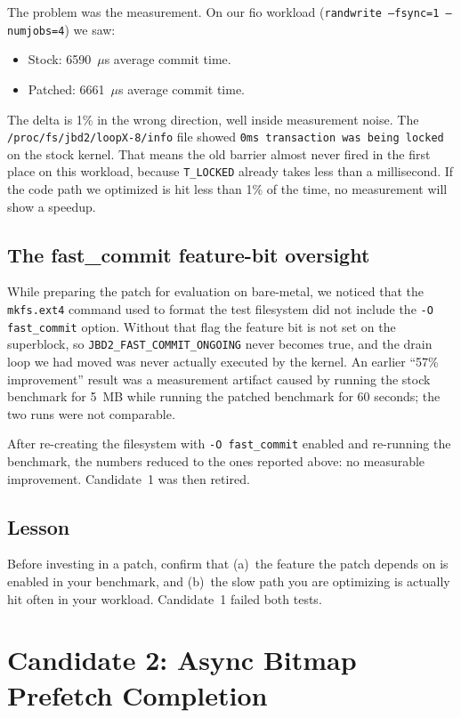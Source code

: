 \documentclass[11pt,a4paper]{article}
\begin{document}
The problem was the measurement. On our fio workload
(\texttt{randwrite --fsync=1 --numjobs=4}) we saw:
\begin{itemize}[leftmargin=*]
  \item Stock: 6590~$\mu$s average commit time.
  \item Patched: 6661~$\mu$s average commit time.
\end{itemize}

The delta is 1\% in the wrong direction, well inside measurement
noise. The \texttt{/proc/fs/jbd2/loopX-8/info} file showed
\texttt{0ms transaction was being locked} on the stock kernel.
That means the old barrier almost never fired in the first place on
this workload, because \texttt{T\_LOCKED} already takes less than a
millisecond. If the code path we optimized is hit less than 1\% of
the time, no measurement will show a speedup.

\subsection{The fast\_commit feature-bit oversight}

While preparing the patch for evaluation on bare-metal, we noticed
that the \texttt{mkfs.ext4} command used to format the test
filesystem did not include the \texttt{-O fast\_commit} option.
Without that flag the feature bit is not set on the superblock, so
\texttt{JBD2\_FAST\_COMMIT\_ONGOING} never becomes true, and the
drain loop we had moved was never actually executed by the kernel.
An earlier ``57\% improvement'' result was a measurement artifact
caused by running the stock benchmark for 5~MB while running the
patched benchmark for 60 seconds; the two runs were not comparable.

After re-creating the filesystem with \texttt{-O fast\_commit}
enabled and re-running the benchmark, the numbers reduced to the
ones reported above: no measurable improvement. Candidate~1 was
then retired.

\subsection{Lesson}

Before investing in a patch, confirm that (a)~the feature the patch
depends on is enabled in your benchmark, and (b)~the slow path you
are optimizing is actually hit often in your workload. Candidate~1
failed both tests.

\section{Candidate 2: Async Bitmap Prefetch Completion}
\end{document}
